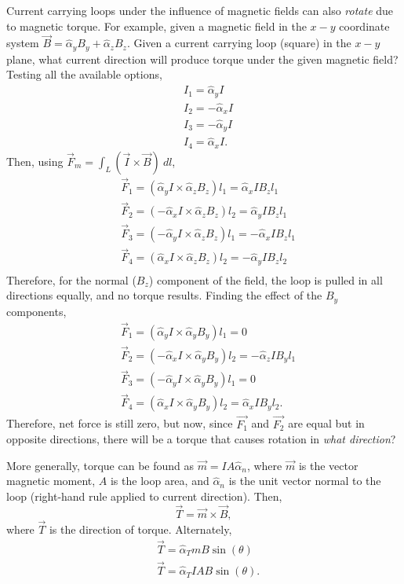 \documentclass{article}
\begin{document}
Current carrying loops under the influence of magnetic fields can also \textit{rotate} due to magnetic torque. For example, given a magnetic field in the \(x-y\) coordinate system \(\vec{B} = \hat{\alpha}_y B_y+ \hat{\alpha}_z B_z\). Given a current carrying loop (square) in the \(x-y\) plane, what current direction will produce torque under the given magnetic field? Testing all the available options, 
\begin{align*}
	& I_1 = \hat{\alpha}_y I\\
	& I_2 = -\hat{\alpha}_x I\\
	& I_3 = -\hat{\alpha}_y I\\
	& I_4 = \hat{\alpha}_x I.
\end{align*}
Then, using \(\vec{F}_m = \int_{L} (\vec{I} \times \vec{B}) \ dl\),
\begin{align*}
	& \vec{F}_1 = (\hat{\alpha}_y I \times \hat{\alpha}_z B_z) l_1 = \hat{\alpha}_x I B_z l_1\\
	& \vec{F}_2 = (-\hat{\alpha}_x I \times \hat{\alpha}_z B_z) l_2 = \hat{\alpha}_y I B_z l_1\\
	& \vec{F}_3 = (-\hat{\alpha}_y I \times \hat{\alpha}_z B_z) l_1 = -\hat{\alpha}_x I B_z l_1\\
	& \vec{F}_4 = (\hat{\alpha}_x I \times \hat{\alpha}_z B_z) l_2 = -\hat{\alpha}_y I B_z l_2\\
\end{align*}
Therefore, for the normal (\(B_z\)) component of the field, the loop is pulled in all directions equally, and no torque results. Finding the effect of the \(B_y\) components, 
\begin{align*}
	& \vec{F}_1 = (\hat{\alpha}_y I \times \hat{\alpha}_y B_y) l_1 = 0 \\
	& \vec{F}_2 = (-\hat{\alpha}_x I \times \hat{\alpha}_y B_y) l_2 = -\hat{\alpha}_z I B_y l_1\\
	& \vec{F}_3 = (-\hat{\alpha}_y I \times \hat{\alpha}_y B_y) l_1 = 0 \\
	& \vec{F}_4 = (\hat{\alpha}_x I \times \hat{\alpha}_y B_y) l_2 =  \hat{\alpha}_x I B_y l_2.
\end{align*}
Therefore, net force is still zero, but now, since \(\vec{F_1}\) and \(\vec{F_2}\) are equal but in opposite directions, there will be a torque that causes rotation in \textit{what direction}? 

More generally, torque can be found as \(\vec{m} = IA \hat{\alpha}_n\), where \(\vec{m}\) is the vector magnetic moment, \(A\) is the loop area, and \(\hat{\alpha}_n\) is the unit vector normal to the loop (right-hand rule applied to current direction). Then, 
\[
  \vec{T} = \vec{m} \times \vec{B},
\]
where \(\vec{T}\) is the direction of torque. Alternately, 
\begin{align*}
	& \vec{T} = \hat{\alpha}_T m B \sin{(\theta)} \\
	&\vec{T} = \hat{\alpha}_T I A B \sin{(\theta)}.
\end{align*}
\end{document}
